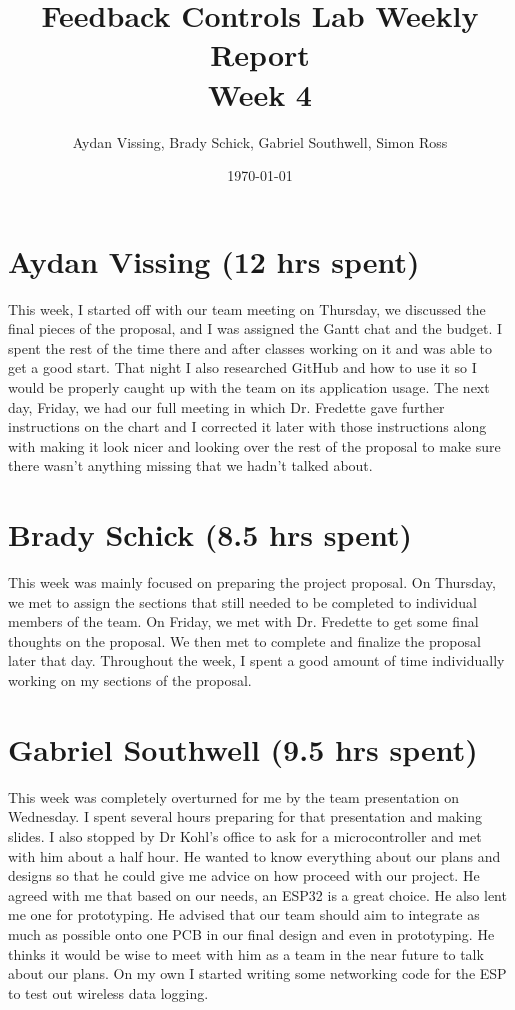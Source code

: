 \documentclass[12pt, titlepage]{article}
\title{Feedback Controls Lab Weekly Report \\ \normalsize{Week 4}}
\author{Aydan Vissing, Brady Schick, Gabriel Southwell, Simon Ross}
\date{\today}
\begin{document}
\maketitle

\section*{Aydan Vissing (12 hrs spent)}

This week, I started off with our team meeting on Thursday, we discussed the final pieces of the proposal, and I was assigned the Gantt chat and the budget. I spent the rest of the time there and after classes working on it and was able to get a good start. That night I also researched GitHub and how to use it so I would be properly caught up with the team on its application usage. The next day, Friday, we had our full meeting in which Dr. Fredette gave further instructions on the chart and I corrected it later with those instructions along with making it look nicer and looking over the rest of the proposal to make sure there wasn’t anything missing that we hadn’t talked about. 

\section*{Brady Schick (8.5 hrs spent)}

This week was mainly focused on preparing the project proposal. On Thursday, we met to assign the sections that still needed to be completed to individual members of the team. On Friday, we met with Dr. Fredette to get some final thoughts on the proposal. We then met to complete and finalize the proposal later that day. Throughout the week, I spent a good amount of time individually working on my sections of the proposal.

\section*{Gabriel Southwell (9.5 hrs spent)}

This week was completely overturned for me by the team presentation on Wednesday. I spent several hours preparing for that presentation and making slides. I also stopped by Dr Kohl’s office to ask for a microcontroller and met with him about a half hour. He wanted to know everything about our plans and designs so that he could give me advice on how proceed with our project. He agreed with me that based on our needs, an ESP32 is a great choice. He also lent me one for prototyping. He advised that our team should aim to integrate as much as possible onto one PCB in our final design and even in prototyping. He thinks it would be wise to meet with him as a team in the near future to talk about our plans. On my own I started writing some networking code for the ESP to test out wireless data logging.
\end{document}
